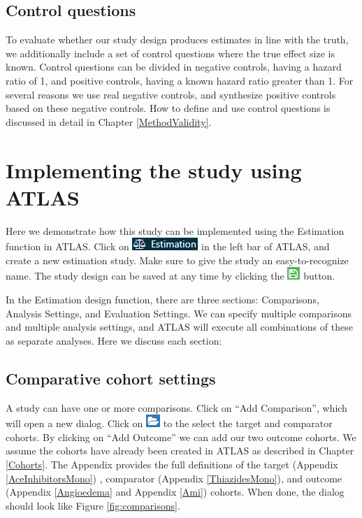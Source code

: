 \documentclass[11pt]{book}
\begin{document}
\subsection{Control questions}\label{control-questions}

To evaluate whether our study design produces estimates in line with the
truth, we additionally include a set of control questions where the true
effect size is known. Control questions can be divided in negative
controls, having a hazard ratio of 1, and positive controls, having a
known hazard ratio greater than 1. For several reasons we use real
negative controls, and synthesize positive controls based on these
negative controls. How to define and use control questions is discussed
in detail in Chapter \ref{MethodValidity}.

\section{Implementing the study using ATLAS}\label{PleAtlas}

Here we demonstrate how this study can be implemented using the
Estimation function in ATLAS. Click on
\includegraphics{images/PopulationLevelEstimation/estimation.png} in the
left bar of ATLAS, and create a new estimation study. Make sure to give
the study an easy-to-recognize name. The study design can be saved at
any time by clicking the
\includegraphics{images/PopulationLevelEstimation/save.png} button.

In the Estimation design function, there are three sections:
Comparisons, Analysis Settings, and Evaluation Settings. We can specify
multiple comparisons and multiple analysis settings, and ATLAS will
execute all combinations of these as separate analyses. Here we discuss
each section:

\subsection{Comparative cohort settings}\label{ComparisonSettings}

A study can have one or more comparisons. Click on ``Add Comparison'',
which will open a new dialog. Click on
\includegraphics{images/PopulationLevelEstimation/open.png} to the
select the target and comparator cohorts. By clicking on ``Add Outcome''
we can add our two outcome cohorts. We assume the cohorts have already
been created in ATLAS as described in Chapter \ref{Cohorts}. The
Appendix provides the full definitions of the target (Appendix
\ref{AceInhibitorsMono}) , comparator (Appendix \ref{ThiazidesMono}),
and outcome (Appendix \ref{Angioedema} and Appendix \ref{Ami}) cohorts.
When done, the dialog should look like Figure \ref{fig:comparisons}.
\end{document}

